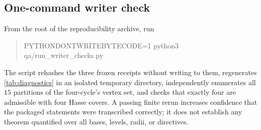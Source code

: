 \subsection{One-command writer check}

From the root of the reproducibility archive, run
\begin{quote}
\ttfamily
PYTHONDONTWRITEBYTECODE=1 python3 qa/run\_writer\_checks.py
\end{quote}
The script rehashes the three frozen receipts without writing to them,
regenerates \cref{tab:diagnostics} in an isolated temporary directory,
independently enumerates all $15$ partitions of the four-cycle's vertex
set, and checks that exactly four are admissible with four Hasse covers.  A
passing finite rerun increases confidence that the packaged statements were
transcribed correctly; it does not establish any theorem quantified over
all bases, levels, radii, or directives.
